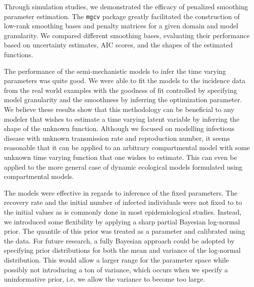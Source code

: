 \documentclass[
11pt, %
oneside, %
english, %
singlespacing, %
]{macthesis} %
\begin{document}
Through simulation studies, we demonstrated the efficacy of penalized smoothing parameter estimation. The \texttt{mgcv} package greatly facilitated the construction of low-rank smoothing bases and penalty matrices for a given domain and model granularity. We compared different smoothing bases, evaluating their performance based on uncertainty estimates, AIC scores, and the shapes of the estimated functions.

The performance of the semi-mechanistic models to infer the time varying parameters was quite good. We were able to fit the models to the incidence data from the real world examples with the goodness of fit controlled by specifying model granularity and the smoothness by inferring the optimization parameter. We believe these results show that this methodology can be beneficial to any modeler that wishes to estimate a time varying latent variable by inferring the shape of the unknown function. Although we focused on modelling infectious disease with unknown transmission rate and reproduction number, it seems reasonable that it can be applied to an arbitrary compartmental model with some unknown time varying function that one wishes to estimate. This can even be applied to the more general case of dynamic ecological models formulated using compartmental models.

The models were effective in regards to inference of the fixed parameters. The recovery rate and the initial number of infected individuals were not fixed to to the initial values as is commonly done in most epidemiological studies. Instead, we introduced some flexibility by applying a sharp partial Bayesian log-normal prior. The quantile of this prior was treated as a parameter and calibrated using the data. For future research, a fully Bayesian approach could be adopted by specifying prior distributions for both the mean and variance of the log-normal distribution. This would allow a larger range for the parameter space while possibly not introducing a ton of variance, which occurs when we specify a uninformative prior, i.e, we allow the variance to become too large.
\end{document}
